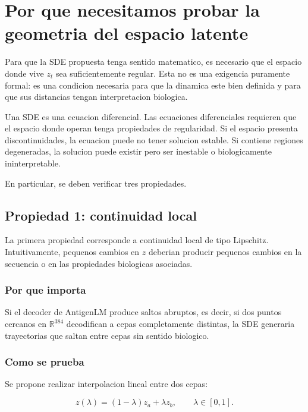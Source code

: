 \documentclass[12pt,letterpaper]{article}
\newcommand{\R}{\mathbb{R}}
\begin{document}
\section{Por que necesitamos probar la geometria del espacio latente}

Para que la SDE propuesta tenga sentido matematico, es necesario que el espacio donde vive $z_t$ sea suficientemente regular. Esta no es una exigencia puramente formal: es una condicion necesaria para que la dinamica este bien definida y para que sus distancias tengan interpretacion biologica.

Una SDE es una ecuacion diferencial. Las ecuaciones diferenciales requieren que el espacio donde operan tenga propiedades de regularidad. Si el espacio presenta discontinuidades, la ecuacion puede no tener solucion estable. Si contiene regiones degeneradas, la solucion puede existir pero ser inestable o biologicamente ininterpretable.

En particular, se deben verificar tres propiedades.

\subsection{Propiedad 1: continuidad local}

La primera propiedad corresponde a continuidad local de tipo Lipschitz. Intuitivamente, pequenos cambios en $z$ deberian producir pequenos cambios en la secuencia o en las propiedades biologicas asociadas.

\subsubsection*{Por que importa}

Si el decoder de AntigenLM produce saltos abruptos, es decir, si dos puntos cercanos en $\R^{384}$ decodifican a cepas completamente distintas, la SDE generaria trayectorias que saltan entre cepas sin sentido biologico.

\subsubsection*{Como se prueba}

Se propone realizar interpolacion lineal entre dos cepas:

\begin{equation}
    z(\lambda) = (1-\lambda) z_a + \lambda z_b, \qquad \lambda \in [0,1].
\end{equation}
\end{document}

